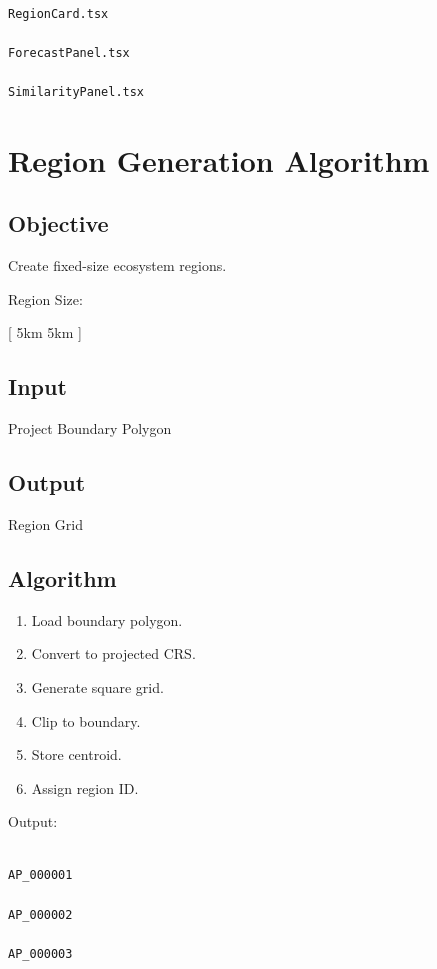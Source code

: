 \documentclass[11pt,a4paper]{article}
\begin{document}
\begin{verbatim}

RegionCard.tsx

ForecastPanel.tsx

SimilarityPanel.tsx

\end{verbatim}

\section{Region Generation Algorithm}

\subsection{Objective}

Create fixed-size ecosystem regions.

Region Size:

[
5km \times 5km
]

\subsection{Input}

Project Boundary Polygon

\subsection{Output}

Region Grid

\subsection{Algorithm}

\begin{enumerate}
\item Load boundary polygon.
\item Convert to projected CRS.
\item Generate square grid.
\item Clip to boundary.
\item Store centroid.
\item Assign region ID.
\end{enumerate}

Output:

\begin{verbatim}

AP_000001

AP_000002

AP_000003

\end{verbatim}
\end{document}
